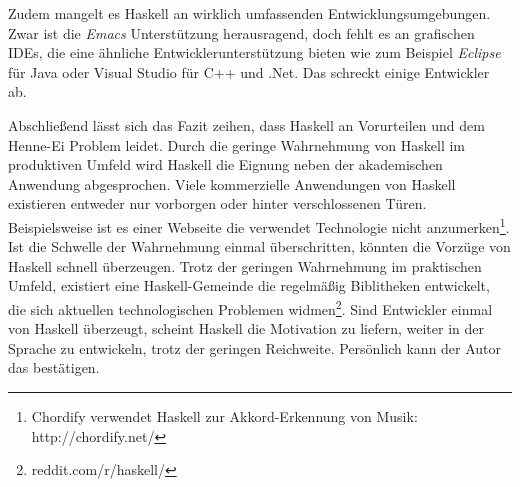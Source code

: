 Zudem mangelt es Haskell an wirklich umfassenden Entwicklungsumgebungen. Zwar ist die \textit{Emacs} Unterstützung herausragend, doch fehlt es an grafischen \ac{IDE}s, die eine ähnliche Entwicklerunterstützung bieten wie zum Beispiel \textit{Eclipse} für Java oder {Visual Studio} für C++ und .Net. Das schreckt einige Entwickler ab.

Abschließend lässt sich das Fazit zeihen, dass Haskell an Vorurteilen und dem Henne-Ei Problem leidet. Durch die geringe Wahrnehmung von Haskell im produktiven Umfeld wird Haskell die Eignung neben der akademischen Anwendung abgesprochen. Viele kommerzielle Anwendungen von Haskell existieren entweder nur vorborgen oder hinter verschlossenen Türen. Beispielsweise ist es einer Webseite die verwendet Technologie nicht anzumerken\footnote{Chordify verwendet Haskell zur Akkord-Erkennung von Musik: http://chordify.net/}. Ist die Schwelle der Wahrnehmung einmal überschritten, könnten die Vorzüge von Haskell schnell überzeugen. Trotz der geringen Wahrnehmung im praktischen Umfeld, existiert eine Haskell-Gemeinde die regelmäßig Biblitheken entwickelt, die sich aktuellen technologischen Problemen widmen\footnote{reddit.com/r/haskell/}. Sind Entwickler einmal von Haskell überzeugt, scheint Haskell die Motivation zu liefern, weiter in der Sprache zu entwickeln, trotz der geringen Reichweite. Persönlich kann der Autor das bestätigen.
